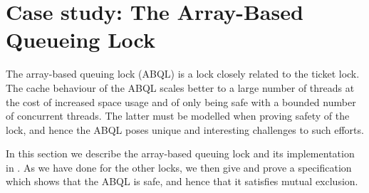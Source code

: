 \section{Case study: The Array-Based Queueing Lock}
\label{sec:array-lock}

\newcommand{\addition}[1]{\textcolor{red}{ #1 }}

\newcommand{\seq}{\text{seq}}

\renewcommand{\Cap}{\textit{cap}\xspace}
\newcommand{\Rem}{\ensuremath{\;\mathrm{rem}\;}}
\newcommand{\Div}{\ `\text{div}`\ }
\newcommand{\length}{\text{length}\xspace}

\newcommand{\allocN}{\langkw{alloc$_N$}}
\newcommand{\plusl}{+_{l}}

\newcommand{\Array}{\textit{array}\xspace}
\newcommand{\xs}{\textit{xs}\xspace}
\newcommand{\ps}{\textit{ps}\xspace}
\newcommand{\ticket}{\textit{ticket}}
\newcommand{\Next}{\textit{next}}

\newcommand{\lockedGKO}{\text{locked}(\gamma, \kappa, o)}
\newcommand{\isLockA}{\ensuremath{\isLock(\gamma, \iota, \kappa, l, \Cap, R)}\xspace}
\newcommand{\invitation}{\operatorname{invitation}}
\newcommand{\issuedA}{\text{issued}(\gamma, o)}
\newcommand{\rightK}{\ensuremath{\text{right}(\kappa)}\xspace}
\newcommand{\leftK}{\ensuremath{\text{left}(\kappa)}\xspace}
\newcommand{\bothK}{\ensuremath{\text{both}(\kappa)}\xspace}
\newcommand{\nthTrue}{\text{nthTrue}}
\newcommand{\nthTrueCapO}{\text{nthTrue}(\Cap, o \Rem \Cap)}

\renewcommand{\Prop}{\textsf{Prop}}
\renewcommand{\Val}{\text{Val}}
\newcommand{\GN}{\textsf{GhostName}} %
\newcommand{\replicate}{\operatorname{replicate}}

\newcommand{\true}{\textsf{true}}
\newcommand{\false}{\textsf{false}}

\newcommand{\arraylock}{array-based queuing lock\xspace}

The array-based queuing lock (ABQL) is a lock closely related to the ticket
lock. The cache behaviour of the ABQL scales better to a large number of threads
at the cost of increased space usage and of only being safe with a bounded
number of concurrent threads. The latter must be modelled when proving safety of
the lock, and hence the ABQL poses unique and interesting challenges to such
efforts.

In this section we describe the \arraylock{} and its implementation in
\proglang. As we have done for the other locks, we then give and prove a
specification which shows that the ABQL is safe, and hence that it satisfies
mutual exclusion.

